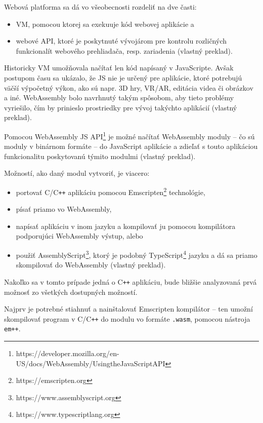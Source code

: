 Webová platforma sa dá vo všeobecnosti rozdeliť na dve časti:
\begin{itemize}
\item {VM, pomocou ktorej sa exekuuje kód webovej aplikácie a}
\item {webové API, ktoré je poskytnuté vývojárom pre kontrolu rozličných funkcionalít webového prehliadača, resp. zariadenia  \cite{webassembly_concepts} (vlastný preklad).}
\end{itemize}

Historicky VM umožňovala načítať len kód napísaný v JavaScripte. Avšak postupom času sa ukázalo, že JS nie je určený pre aplikácie, ktoré potrebujú väčší výpočetný výkon, ako sú napr. 3D hry, VR/AR, editácia videa či obrázkov a iné.
WebAssembly bolo navrhnutý takým spôsobom, aby tieto problémy vyriešilo, čím by prinieslo prostriedky pre vývoj takýchto aplikácií \cite{webassembly_concepts} (vlastný preklad). 

Pomocou WebAssembly JS API\footnote{https://developer.mozilla.org/en-US/docs/WebAssembly/Using\textunderscore the\textunderscore JavaScript\textunderscore API} je možné načítať WebAssembly moduly -- čo sú moduly v binárnom formáte -- do JavaScript aplikácie a zdieľať s touto aplikáciou funkcionalitu poskytovanú týmito modulmi \cite{webassembly_concepts} (vlastný preklad).

Možností, ako daný modul vytvoriť, je viacero:
\begin {itemize}
\item {portovať C/C\texttt{++} aplikáciu pomocou Emscripten\footnote{https://emscripten.org} technológie,}
\item {písať priamo vo WebAssembly,}
\item {napísať aplikáciu v inom jazyku a kompilovať ju pomocou kompilátora podporujúci WebAssembly výstup, alebo}
\item {použiť AssemblyScript\footnote{https://www.assemblyscript.org}, ktorý je podobný TypeScript\footnote{https://www.typescriptlang.org} jazyku a dá sa priamo skompilovať do WebAssembly \cite{webassembly_concepts} (vlastný preklad).}
\end {itemize}

Nakoľko sa v tomto prípade jedná o C\texttt{++} aplikáciu, bude bližšie analyzovaná prvá možnosť zo všetkých dostupných možností.

Najprv je potrebné stiahnuť a nainštalovať Emscripten kompilátor -- ten umožní skompilovať program v C/C\texttt{++} do modulu vo formáte \texttt{.wasm}, pomocou nástroja \texttt{em++}.

